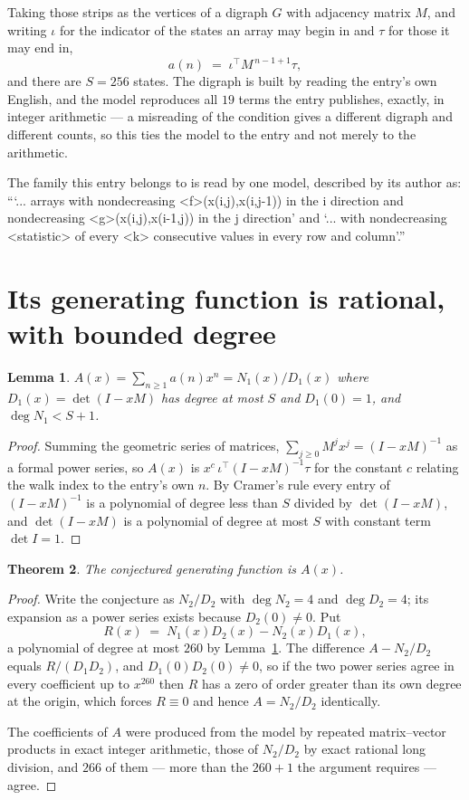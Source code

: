 \documentclass[11pt,a4paper]{article}
\theoremstyle{plain}
\newtheorem{theorem}{Theorem}
\newtheorem{lemma}[theorem]{Lemma}
\theoremstyle{definition}
\begin{document}
Taking those strips as the vertices of a digraph $G$ with adjacency matrix $M$, and writing
$\iota$ for the indicator of the states an array may begin in and $\tau$ for those it may end
in,
\[
a(n)\;=\;\iota^{\!\top}M^{\,n-1+1}\tau ,
\]
and there are $S=256$ states. The digraph is built by reading the entry's own English, and the
model reproduces all $19$ terms the entry publishes, exactly, in integer arithmetic --- a
misreading of the condition gives a different digraph and different counts, so this ties the
model to the entry and not merely to the arithmetic.

The family this entry belongs to is read by one model, described by its author as: ```... arrays with nondecreasing <f>(x(i,j),x(i,j-1)) in the i direction and nondecreasing <g>(x(i,j),x(i-1,j)) in the j direction' and `... with nondecreasing <statistic> of every <k> consecutive values in every row and column'.''


\section{Its generating function is rational, with bounded degree}

\begin{lemma}\label{lem:rat}
$A(x)=\sum_{n\ge1}a(n)x^n=N_1(x)/D_1(x)$ where $D_1(x)=\det(I-xM)$ has degree at most
$S$ and $D_1(0)=1$, and $\deg N_1<S+1$.
\end{lemma}

\begin{proof}
Summing the geometric series of matrices, $\sum_{j\ge0}M^jx^j=(I-xM)^{-1}$ as a formal
power series, so $A(x)$ is $x^{c}\,\iota^{\!\top}(I-xM)^{-1}\tau$ for the constant $c$
relating the walk index to the entry's own $n$. By Cramer's rule every entry of
$(I-xM)^{-1}$ is a polynomial of degree less than $S$ divided by $\det(I-xM)$, and
$\det(I-xM)$ is a polynomial of degree at most $S$ with constant term $\det I=1$.
\end{proof}

\begin{theorem}
The conjectured generating function is $A(x)$.
\end{theorem}

\begin{proof}
Write the conjecture as $N_2/D_2$ with $\deg N_2=4$ and $\deg D_2=4$; its expansion as a
power series exists because $D_2(0)\neq0$. Put
\[
R(x)\;=\;N_1(x)D_2(x)-N_2(x)D_1(x),
\]
a polynomial of degree at most $260$ by Lemma~\ref{lem:rat}. The difference
$A-N_2/D_2$ equals $R/(D_1D_2)$, and $D_1(0)D_2(0)\neq0$, so if the two power series agree in
every coefficient up to $x^{260}$ then $R$ has a zero of order greater than its own
degree at the origin, which forces $R\equiv0$ and hence $A=N_2/D_2$ identically.

The coefficients of $A$ were produced from the model by repeated matrix--vector products in
exact integer arithmetic, those of $N_2/D_2$ by exact rational long division, and $266$
of them --- more than the $260+1$ the argument requires --- agree.
\end{proof}
\end{document}
